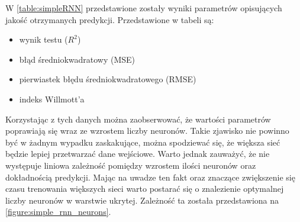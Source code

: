 \documentclass[10pt,a4paper]{article}
\begin{document}
W \autoref{table:simpleRNN} przedstawione zostały wyniki parametrów opisujących jakość otrzymanych predykcji. Przedstawione w tabeli są:
\begin{center}
	\begin{itemize}
		\item wynik testu ($R^2$)
		\item błąd średniokwadratowy (MSE)
		\item pierwiastek błędu średniokwadratowego (RMSE)
		\item indeks Willmott'a
	\end{itemize}
\end{center}

Korzystając z tych danych można zaobserwować, że wartości parametrów poprawiają się wraz ze wzrostem liczby neuronów. Takie zjawisko nie powinno być w żadnym wypadku zaskakujące, można spodziewać się, że większa sieć będzie lepiej przetwarzać dane wejściowe. Warto jednak zauważyć, że nie występuje liniowa zależność pomiędzy wzrostem ilości neuronów oraz dokładnością predykcji. Mając na uwadze ten fakt oraz znaczące zwiększenie się czasu trenowania większych sieci warto postarać się o znalezienie optymalnej liczby neuronów w warstwie ukrytej. Zależność ta została przedstawiona na \autoref{figure:simple_rnn_neurons}.
\end{document}
